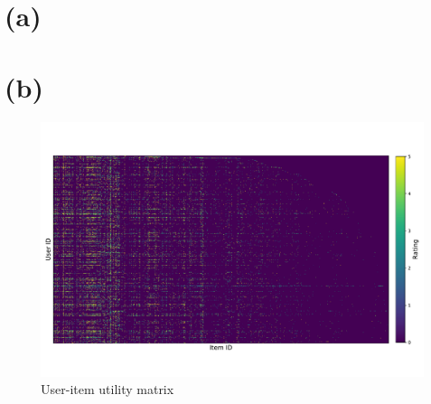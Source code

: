 
\usepackage{graphicx}
\usepackage{float}
\usepackage{multicol}
\usepackage{balance}
\usepackage{multicol}
\usepackage{multirow}
\usepackage{epstopdf}
\usepackage{epsfig}
\usepackage{makeidx}
\usepackage{bm}
\usepackage{pbox}
\usepackage{pdflscape}
\usepackage{url}
\usepackage{framed}
\usepackage{mathtools}
\usepackage{adjustbox}
\usepackage{amsmath}
\usepackage{hyperref}
\usepackage{subcaption}
\usepackage{cite}
\usepackage{amsfonts}

\usepackage{graphicx, amssymb, amsmath, listings, float, mathtools}
\usepackage{color, url}
\lstset{language = Python}
\lstset{breaklines}
\lstset{extendedchars=false}

\oddsidemargin 0in
\evensidemargin 0in
\textwidth 6.5in
\topmargin -0.6in
\textheight 9.0in





\section*{(a)}

\section*{(b)}


\begin{figure}[H]
\centering
\includegraphics[width=1.0\textwidth]{./figures/utility.pdf}
\caption{\label{fig:utility} User-item utility matrix}
\end{figure}

